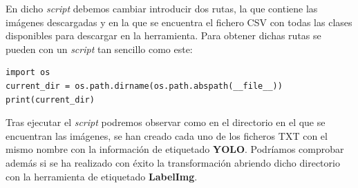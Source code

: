 En dicho \textit{script} debemos cambiar introducir dos rutas, la que contiene las imágenes descargadas y en la que se encuentra el fichero CSV con todas las clases disponibles para descargar en la herramienta. Para obtener dichas rutas se pueden con un \textit{script} tan sencillo como este:

\begin{lstlisting}
import os
current_dir = os.path.dirname(os.path.abspath(__file__))
print(current_dir)
\end{lstlisting}

Tras ejecutar el \textit{script} podremos observar como en el directorio en el que se encuentran las imágenes, se han creado cada uno de los ficheros TXT con el mismo nombre con la información de etiquetado \textbf{YOLO}. Podríamos comprobar además si se ha realizado con éxito la transformación abriendo dicho directorio con la herramienta de etiquetado \textbf{LabelImg}.
